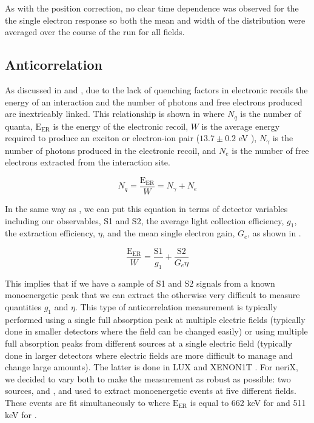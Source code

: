 As with the position correction, no clear time dependence was observed for the the single electron response so both the mean and width of the distribution were averaged over the course of the run for all fields.



\subsection{Anticorrelation}
\label{sec:nerix_anticorrelation}

As discussed in  and , due to the lack of quenching factors in electronic recoils the energy of an interaction and the number of photons and free electrons produced are inextricably linked.  This relationship is shown in  where $N_q$ is the number of quanta, $\textrm{E}_{\textrm{ER}}$ is the energy of the electronic recoil, $W$ is the average energy required to produce an exciton or electron-ion pair ($13.7 \pm 0.2$ eV \cite{dahl_thesis}), $N_{\gamma}$ is the number of photons produced in the electronic recoil, and $N_e$ is the number of free electrons extracted from the interaction site.

\begin{equation}
        \label{eqn:nerix_anticorrelation}
        N_q = \frac{\textrm{E}_{\textrm{ER}}}{W} = N_{\gamma} + N_{e}
\end{equation} 

In the same way as , we can put this equation in terms of detector variables including our observables, S1 and S2, the average light collection efficiency, $g_1$, the extraction efficiency, $\eta$, and the mean single electron gain, $G_e$, as shown in .

\begin{equation}
        \label{eqn:nerix_anticorrelation_s1_s2}
        \frac{\textrm{E}_{\textrm{ER}}}{W} = \frac{\textrm{S1}}{g_1} + \frac{\textrm{S2}}{G_e \eta}
\end{equation}

This implies that if we have a sample of S1 and S2 signals from a known monoenergetic peak that we can extract the otherwise very difficult to measure quantities $g_1$ and $\eta$.  This type of anticorrelation measurement is typically performed using a single full absorption peak at multiple electric fields (typically done in smaller detectors where the field can be changed easily) or using multiple full absorption peaks from different sources at a single electric field (typically done in larger detectors where electric fields are more difficult to manage and change large amounts).  The latter is done in LUX \cite{akerib2016improved} and XENON1T \cite{aprile2017first}.  For neriX, we decided to vary both to make the measurement as robust as possible: two sources, \cesium{} and \sodium{}, and used to extract monoenergetic events at five different fields.  These events are fit simultaneously to  where $\textrm{E}_{\textrm{ER}}$ is equal to 662 keV for \cesium{} and 511 keV for \sodium{}.


